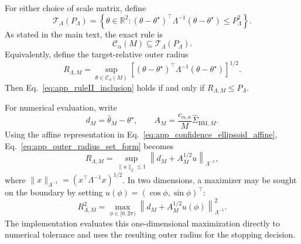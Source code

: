 \documentclass[showpacs,amsmath,amssymb,twocolumn,prx,superscriptaddress,10pt,aps,nofootinbib]{revtex4-2}
\begin{document}
For either choice of scale matrix, define
\begin{equation}
\label{eq:app_target_ellipsoid}
    \mathcal T_\Lambda(P_\Lambda)
    =
    \left\{
        \theta\in\mathbb R^2:
        (\theta-\theta^\star)^\top
        \Lambda^{-1}
        (\theta-\theta^\star)
        \le P_\Lambda^2
    \right\}.
\end{equation}
As stated in the main text, the exact rule is
\begin{equation}
\label{eq:app_ruleII_inclusion}
    \mathcal C_\alpha(M)
    \subseteq
    \mathcal T_\Lambda(P_\Lambda).
\end{equation}
Equivalently, define the target-relative outer radius
\begin{equation}
\label{eq:app_outer_radius_set_form}
    R_{\Lambda,M}
    =
    \sup_{\theta\in\mathcal C_\alpha(M)}
    \left[
        (\theta-\theta^\star)^\top
        \Lambda^{-1}
        (\theta-\theta^\star)
    \right]^{1/2}.
\end{equation}
Then Eq.~\eqref{eq:app_ruleII_inclusion} holds if and only if $R_{\Lambda,M}\le P_\Lambda$.

For numerical evaluation, write
\begin{equation}
\label{eq:app_ruleII_affine_quantities}
    d_M
    =
    \widehat\theta_M-\theta^\star,
    \qquad
    A_M
    =
    \frac{c_{\alpha,a}}{M}
    \widehat\Sigma_{\mathrm{BM},M}.
\end{equation}
Using the affine representation in Eq.~\eqref{eq:app_confidence_ellipsoid_affine}, Eq.~\eqref{eq:app_outer_radius_set_form} becomes
\begin{equation}
\label{eq:app_exact_ellipsoid_radius}
    R_{\Lambda,M}
    =
    \sup_{\|u\|_2\le1}
    \left\|d_M+A_M^{1/2}u\right\|_{\Lambda^{-1}},
\end{equation}
where $\|x\|_{\Lambda^{-1}}=(x^\top\Lambda^{-1}x)^{1/2}$. In two dimensions, a maximizer may be sought on the boundary by setting $u(\phi)=(\cos\phi,\sin\phi)^\top$:
\begin{equation}
\label{eq:app_boundary_search}
    R_{\Lambda,M}^2
    =
    \max_{\phi\in[0,2\pi)}
    \left\|d_M+A_M^{1/2}u(\phi)\right\|_{\Lambda^{-1}}^2.
\end{equation}
The implementation evaluates this one-dimensional maximization directly to numerical tolerance and uses the resulting outer radius for the stopping decision.


\end{document}
